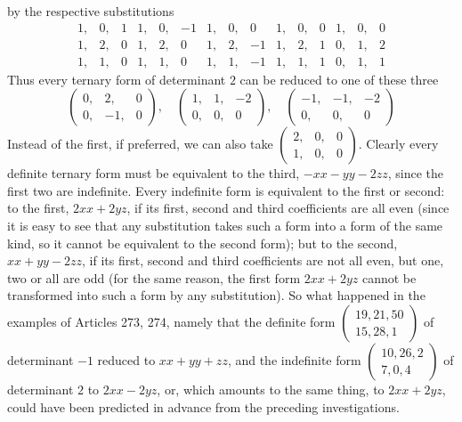 by the respective substitutions
\[
\begin{array}{rrr|rrr|rrr|rrr|rrr}
1,&0,&1&1,&0,&-1&1,&0,&0&1,&0,&0&1,&0,&0\\
1,&2,&0&1,&2,&0&1,&2,&-1&1,&2,&1&0,&1,&2\\
1,&1,&0&1,&1,&0&1,&1,&-1&1,&1,&1&0,&1,&1
\end{array}
\]
Thus every ternary form of determinant \(2\) can be reduced to one of these three
\[
\left(\begin{smallmatrix}0,&2,&0\\0,&-1,&0\end{smallmatrix}\right),\quad
\left(\begin{smallmatrix}1,&1,&-2\\0,&0,&0\end{smallmatrix}\right),\quad
\left(\begin{smallmatrix}-1,&-1,&-2\\0,&0,&0\end{smallmatrix}\right)
\]
Instead of the first, if preferred, we can also take \(\left(\begin{smallmatrix}2,&0,&0\\1,&0,&0\end{smallmatrix}\right)\). Clearly every definite ternary form must be equivalent to the third, \(-xx-yy-2zz\), since the first two are indefinite. Every indefinite form is equivalent to the first or second: to the first, \(2xx+2yz\), if its first, second and third coefficients are all even (since it is easy to see that any substitution takes such a form into a form of the same kind, so it cannot be equivalent to the second form); but to the second, \(xx+yy-2zz\), if its first, second and third coefficients are not all even, but one, two or all are odd (for the same reason, the first form \(2xx+2yz\) cannot be transformed into such a form by any substitution).
So what happened in the examples of Articles 273, 274, namely that the definite form
$\left(\begin{smallmatrix}19,21,50\\15,28,1\end{smallmatrix}\right)$
of determinant $-1$ reduced to $xx+yy+zz$, and the indefinite form
$\left(\begin{smallmatrix}10,26,2\\7,0,4\end{smallmatrix}\right)$
of determinant $2$ to $2xx-2yz$, or, which amounts to the same thing, to $2xx+2yz$, could have been predicted in advance from the preceding investigations.

